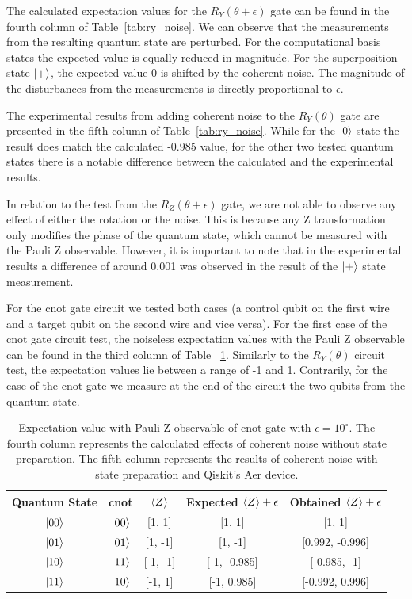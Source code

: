 The calculated expectation values for the \(R_{Y}(\theta + \epsilon)\) gate
can be found in the fourth column of Table~\ref{tab:ry_noise}. We can
observe that the measurements from the resulting quantum state are
perturbed. For the computational basis states the expected value is
equally reduced in magnitude. For the superposition state \(\ket{+}\),
the expected value 0 is shifted by the coherent noise. The magnitude
of the disturbances from the measurements is directly proportional to
\(\epsilon\). \

The experimental results from adding coherent noise to the
\(R_{Y}(\theta)\) gate are presented in the fifth column of Table~\ref{tab:ry_noise}. 
While for the \(\ket{0}\) state the result does match the calculated
-0.985 value, for the other two tested quantum states there is a
notable difference between the calculated and the experimental results. \

In relation to the test from the \(R_{Z}(\theta + \epsilon)\) gate, we
are not able to observe any effect of either the rotation or the noise.
This is because any Z transformation only modifies the phase of the
quantum state, which cannot be measured with the Pauli Z observable.
However, it is important to note that in the experimental results
a difference of around 0.001 was observed in the result of the \(\ket{+}\)
state measurement. \

For the \ac{cnot} gate circuit we tested both cases (a control qubit on the
first wire and a target qubit on the second wire and vice versa). For
the first case of the \ac{cnot}  gate circuit test, the noiseless expectation
values with the Pauli Z observable can be found in the third column of Table
~\ref{tab:cnot_noise}. Similarly to the \(R_{Y}(\theta)\) circuit test,
the expectation values lie between a range of -1 and 1. Contrarily,
for the case of the \ac{cnot}  gate we measure at the end of the circuit the
two qubits from the quantum state. \

\begin{table}[h]
  \centering
  \begin{tabular}{|c|c|c|c|c|}
    \hline
    Quantum State & \ac{cnot} & \(\expval{Z}\) & Expected \(\expval{Z}+\epsilon\) & Obtained \(\expval{Z}+\epsilon\) \\
    \hline
    \(\ket{00}\) & \(\ket{00}\) & [1, 1]   & [1, 1]       & [1, 1]          \\
    \hline
    \(\ket{01}\) & \(\ket{01}\) & [1, -1]  & [1, -1]      & [0.992, -0.996] \\
    \hline
    \(\ket{10}\) & \(\ket{11}\) & [-1, -1] & [-1, -0.985] & [-0.985, -1]    \\
    \hline
    \(\ket{11}\) & \(\ket{10}\) & [-1, 1]  & [-1, 0.985]  & [-0.992, 0.996] \\
    \hline
  \end{tabular}
  \caption{Expectation value with Pauli Z observable of \ac{cnot} gate with \(\epsilon = 10^{\circ}\).
  The fourth column represents the calculated effects of coherent noise without state preparation.
  The fifth column represents the results of coherent noise with state preparation and Qiskit's Aer device.}\label{tab:cnot_noise}
\end{table} \

